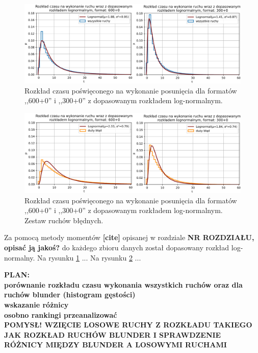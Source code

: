 \documentclass[inzynierska]{pwr_wmat_praca_dyplomowa}
\theoremstyle{plain}
\numberwithin{theorem}{chapter}
\theoremstyle{definition}
\numberwithin{theorem}{chapter}
\begin{document}
\begin{figure}[H]
	\centering
	\includegraphics[width=\textwidth]{rozklad_lognorm.png}
	\caption{Rozkład czasu poświęconego na wykonanie posunięcia dla formatów ,,600+0'' i ,,300+0'' z dopasowanym rozkładem log-normalnym.}
	\label{rys:rozklad_lognorm}
\end{figure}
\begin{figure}[H]
	\centering
	\includegraphics[width=\textwidth]{rozklad_lognorm2.png}
	\caption{Rozkład czasu poświęconego na wykonanie posunięcia dla formatów ,,600+0'' i ,,300+0'' z dopasowanym rozkładem log-normalnym. Zestaw ruchów błędnych.}
	\label{rys:rozklad_lognorm2}
\end{figure}
Za pomocą metody momentów \textbf{[cite]} opisanej w rozdziale \textbf{NR ROZDZIAŁU, opisać ją jakoś?} do każdego zbioru danych został dopasowany rozkład log-normalny. Na rysunku \ref{rys:rozklad_lognorm}  ... Na rysunku \ref{rys:rozklad_lognorm2}  ... 

\textbf{PLAN:}\\

\textbf{porównanie rozkładu czasu wykonania wszystkich ruchów oraz dla ruchów blunder (histogram gęstości)\\
	wskazanie różnicy\\
osobno rankingi przeanalizować}\\

\textbf{POMYSŁ! WZIĘCIE LOSOWE RUCHY Z ROZKŁADU TAKIEGO JAK ROZKŁAD RUCHÓW BLUNDER I SPRAWDZENIE RÓŻNICY MIĘDZY BLUNDER A LOSOWYMI RUCHAMI}
\end{document}
